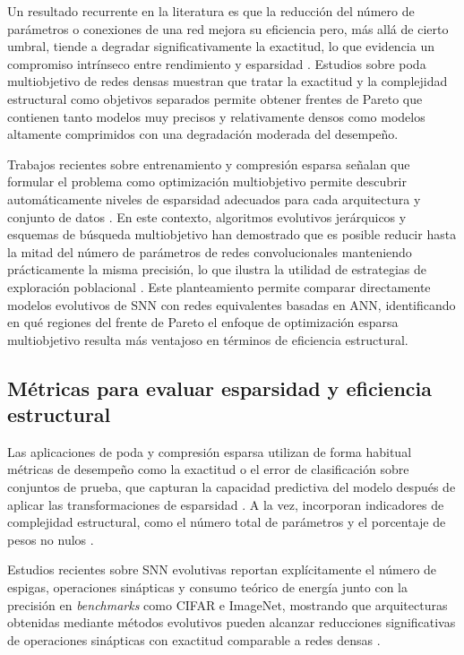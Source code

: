 Un resultado recurrente en la literatura es que la reducción del número de parámetros o conexiones de una red mejora su eficiencia pero, más allá de cierto umbral, tiende a degradar significativamente la exactitud, lo que evidencia un compromiso intrínseco entre rendimiento y esparsidad \cite{REINERS2022sparse}. Estudios sobre poda multiobjetivo \cite{LIAN2024-multi-cnn-ea, HIRSCH2022-mo-dnn-drl} de redes densas muestran que tratar la exactitud y la complejidad estructural como objetivos separados permite obtener frentes de Pareto que contienen tanto modelos muy precisos y relativamente densos como modelos altamente comprimidos con una degradación moderada del desempeño.

Trabajos recientes sobre entrenamiento y compresión esparsa señalan que formular el problema como optimización multiobjetivo permite descubrir automáticamente niveles de esparsidad adecuados para cada arquitectura y conjunto de datos \cite{chen2026multiobjective-llm, Huang2021sparse-opti-multi, Huang2021sparse-opti-multi}. En este contexto, algoritmos evolutivos jerárquicos y esquemas de búsqueda multiobjetivo han demostrado que es posible reducir hasta la mitad del número de parámetros de redes convolucionales manteniendo prácticamente la misma precisión, lo que ilustra la utilidad de estrategias de exploración poblacional \cite{khan2026hierarchicalimportanceguidedmultiobjectiveevolutionary, Yang2019-mo-cnn-ga}. Este planteamiento permite comparar directamente modelos evolutivos de SNN con redes equivalentes basadas en ANN, identificando en qué regiones del frente de Pareto el enfoque de optimización esparsa multiobjetivo resulta más ventajoso en términos de eficiencia estructural.


\subsection{Métricas para evaluar esparsidad y eficiencia estructural}
Las aplicaciones de poda y compresión esparsa utilizan de forma habitual métricas de desempeño como la exactitud o el error de clasificación sobre conjuntos de prueba, que capturan la capacidad predictiva del modelo después de aplicar las transformaciones de esparsidad \cite{REINERS2022sparse, Huang2021sparse-opti-multi}. A la vez, incorporan indicadores de complejidad estructural, como el número total de parámetros y el porcentaje de pesos no nulos \cite{Chen2021-sparse-nn-moo, LIAN2024-multi-cnn-ea}.

Estudios recientes sobre SNN evolutivas \cite{Shen2024EvolutionarySNN} reportan explícitamente el número de espigas, operaciones sinápticas y consumo teórico de energía junto con la precisión en \textit{benchmarks} como CIFAR e ImageNet, mostrando que arquitecturas obtenidas mediante métodos evolutivos pueden alcanzar reducciones significativas de operaciones sinápticas con exactitud comparable a redes densas \cite{Branquinho2023-neuro-conv-snn, LIAN2024-multi-cnn-ea}.

